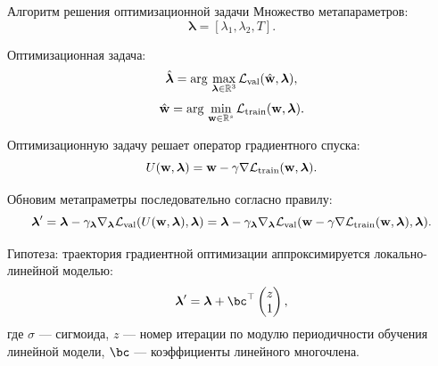 \documentclass[10pt, aspectratio=169]{beamer}
\begin{document}
\begin{frame}{Алгоритм решения оптимизационной задачи}
Множество метапараметров:
\vspace{-0.2 cm}
$$\boldsymbol{\lambda} = [\lambda_1, \lambda_2, T].$$

Оптимизационная задача:
\vspace{-0.2 cm}
$$\hat{\boldsymbol{\lambda}} = \arg\,\max\limits_{\boldsymbol{\lambda} \in \mathbb{R}^3} \mathcal{L}_\text{val}(\hat{\mathbf{w}}, \boldsymbol{\lambda}),$$
$$\hat{\mathbf{w}} = \arg\,\min\limits_{\mathbf{w} \in \mathbb{R}^s} \mathcal{L}_\text{train}(\mathbf{w}, \boldsymbol{\lambda}).$$

Оптимизационную задачу решает оператор градиентного спуска:
\vspace{-0.2 cm}
$$U(\mathbf{w}, \boldsymbol{\lambda}) = \mathbf{w} - \gamma\nabla\mathcal{L}_\text{train}(\mathbf{w}, \boldsymbol{\lambda}).$$

Обновим метапраметры последовательно согласно правилу:
\vspace{-0.2 cm}
$$\boldsymbol{\lambda}^\prime = \boldsymbol{\lambda} - \gamma_{\boldsymbol{\lambda}}\nabla_{\boldsymbol{\lambda}}\mathcal{L}_\text{val}(U(\mathbf{w}, \boldsymbol{\lambda}), \boldsymbol{\lambda}) = \boldsymbol{\lambda} - \gamma_{\boldsymbol{\lambda}}\nabla_{\boldsymbol{\lambda}}\mathcal{L}_\text{val}(\mathbf{w} - \gamma\nabla\mathcal{L}_\text{train}(\mathbf{w}, \boldsymbol{\lambda}), \boldsymbol{\lambda}).$$

{\color{red}Гипотеза}: траектория градиентной оптимизации аппроксимируется локально-линейной моделью:
\vspace{-0.2 cm}
$$\boldsymbol{\lambda}^\prime = 
     \boldsymbol{\lambda} + \bc^{\top}\begin{pmatrix}z\\1\end{pmatrix},$$
где $\sigma$ --- сигмоида, $z$ --- номер итерации по модулю периодичности обучения линейной модели, $\bc$ --- коэффициенты линейного многочлена.


\end{frame}
\end{document}

